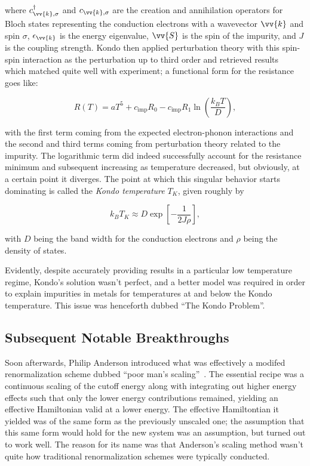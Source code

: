 where $c_{\vv{k},\sigma}^\dagger$ and $c_{\vv{k},\sigma}$ are the creation and annihilation operators for Bloch states representing the conduction electrons with a wavevector $\vv{k}$ and spin $\sigma$, $\epsilon_{\vv{k}}$ is the energy eigenvalue, $\vv{S}$ is the spin of the impurity, and $J$ is the coupling strength. Kondo then applied perturbation theory with this spin-spin interaction as the perturbation up to third order and retrieved results~\cite{Kondo_1964} which matched quite well with experiment; a functional form for the resistance goes like:

\begin{equation}
  R(T) = aT^5 + c_{\mathrm{imp}}R_0 - c_{\mathrm{imp}}R_1 \ln\left( \frac{k_B T}{D} \right),
\end{equation}

with the first term coming from the expected electron-phonon interactions and the second and third terms coming from perturbation theory related to the impurity. The logarithmic term did indeed successfully account for the resistance minimum and subsequent increasing as temperature decreased, but obviously, at a certain point it diverges. The point at which this singular behavior starts dominating is called the \textit{Kondo temperature} $T_K$, given roughly by

\begin{equation}
  k_BT_K \approx D\exp\left[ -\frac{1}{2J\rho} \right],\label{eq:kondo-temperature}
\end{equation}

with $D$ being the band width for the conduction electrons and $\rho$ being the density of states.

Evidently, despite accurately providing results in a particular low temperature regime, Kondo's solution wasn't perfect, and a better model was required in order to explain impurities in metals for temperatures at and below the Kondo temperature. This issue was henceforth dubbed ``The Kondo Problem''.


\subsection{Subsequent Notable Breakthroughs}

Soon afterwards, Philip Anderson introduced what was effectively a modifed renormalization scheme dubbed ``poor man's scaling''~\cite{Anderson_1970}. The essential recipe was a continuous scaling of the cutoff energy along with integrating out higher energy effects such that only the lower energy contributions remained, yielding an effective Hamiltonian valid at a lower energy. The effective Hamiltontian it yielded was of the same form as the previously unscaled one; the assumption that this same form would hold for the new system was an assumption, but turned out to work well. The reason for its name was that Anderson's scaling method wasn't quite how traditional renormalization schemes were typically conducted.

